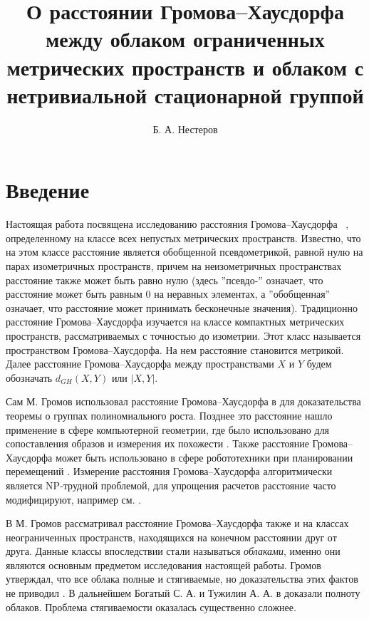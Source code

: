 \documentclass[11pt,twoside,draft
]{article}
\title
{%
  О расстоянии Громова--Хаусдорфа между облаком ограниченных
  метрических пространств и облаком с нетривиальной стационарной группой
}
{%
  On the Gromov--Hausdorff distance between the cloud of bounded
metric spaces and a cloud with nontrivial stabilizer}
\author
{%
Б. А. Нестеров}
{%
B. A. Nesterov}
\begin{document}
\maketitle

\enmaketitle

\section{Введение}  
Настоящая работа посвящена исследованию расстояния Громова--Хаусдорфа
~\cite{Edwards, Gromov81, Gromov99},
определенному на классе всех непустых метрических пространств.
Известно, что на этом классе расстояние является обобщенной
псевдометрикой, равной нулю на парах изометричных пространств, причем
на неизометричных пространствах расстояние также может быть равно
нулю (здесь ''псевдо-'' означает, что расстояние может быть равным
  $0$ на неравных элементах, а ''обобщенная'' означает, что расстояние
может принимать бесконечные значения).
Традиционно расстояние Громова--Хаусдорфа изучается на классе
компактных метрических пространств, рассматриваемых с точностью до
изометрии. Этот класс называется пространством Громова--Хаусдорфа. На
нем расстояние становится метрикой. Далее расстояние
Громова--Хаусдорфа между пространствами $X$ и $Y$ будем обозначать
$d_{GH}(X,Y)$ или $|X,Y|$.

Сам М. Громов использовал расстояние Громова--Хаусдорфа в
\cite{Gromov81} для доказательства теоремы о группах полиномиального роста.
Позднее это расстояние нашло применение в сфере компьютерной
геометрии, где было использовано для сопоставления образов и
измерения их похожести \cite{memoli1}. Также расстояние
Громова--Хаусдорфа может быть использовано в сфере робототехники при
планировании перемещений
\cite{robotics}.
Измерение расстояния Громова--Хаусдорфа алгоритмически является
NP-трудной проблемой, для  упрощения расчетов расстояние часто
модифицируют, например см. \cite{memoli2}.

В \cite{Gromov99}
М. Громов рассматривал расстояние Громова--Хаусдорфа также и на
классах неограниченных пространств, находящихся на конечном
расстоянии друг от друга. Данные классы впоследствии стали называться
\emph{облаками}, именно они являются основным предметом исследования
настоящей работы. Громов утверждал, что все облака полные и
стягиваемые, но доказательства этих фактов не приводил
\cite{Gromov99}. В дальнейшем Богатый С. А. и Тужилин А. А. в
\cite{TuzhBog1} доказали полноту облаков. Проблема стягиваемости
оказалась существенно сложнее.
\end{document}
